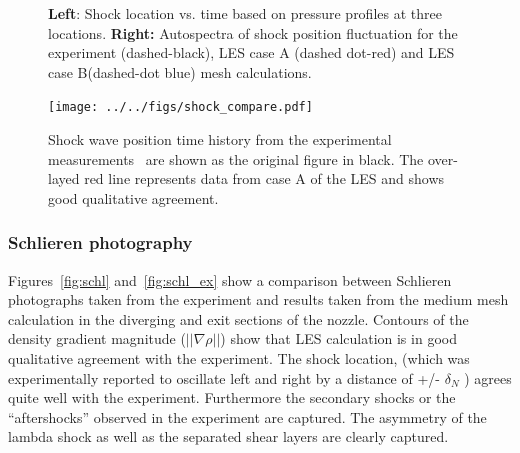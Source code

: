 \documentclass[]{aiaa-tc}%
\begin{document}


\begin{figure}[!h]%
	\centering
 	\caption{ {\bf Left}: Shock location vs. time based on pressure profiles at three locations. {\bf Right:} Autospectra of shock position fluctuation for the experiment (dashed-black), LES case A (dashed dot-red) and LES case B(dashed-dot blue) mesh calculations. }
 	
\end{figure}


\begin{figure}[!h]
	\begin{centering}
	\texttt{[image: ../../figs/shock\_compare.pdf]}
	\caption{ Shock wave position time history from the experimental measurements~\cite{Papam:10} are shown as the original figure in black.  The over-layed red line represents data from case A of the LES and shows good qualitative agreement.
 	\label{fig:shock_compare}
	}
	\end{centering}
\end{figure}



\subsubsection{Schlieren photography}


Figures~\ref{fig:schl} and~\ref{fig:schl_ex} show a comparison between Schlieren photographs taken from the experiment and results taken from the medium mesh calculation in the diverging and exit sections of the nozzle.  Contours of the density gradient magnitude ($||\nabla\rho|| $) show that LES calculation is in good qualitative agreement with the experiment.  The shock location, (which was experimentally reported to oscillate left and right by a distance of +/- $\delta_N$ ) agrees quite well with the experiment.  Furthermore the secondary shocks or the ``aftershocks'' observed in the experiment are captured.  The asymmetry of the lambda shock as well as the separated shear layers are clearly captured.
\end{document}
